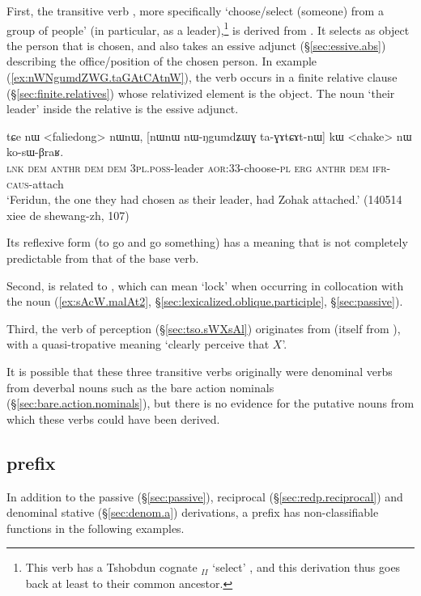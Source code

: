 First, the transitive verb , more specifically `choose/select (someone) from a group of people' (in particular, as a leader),\footnote{This verb has a Tshobdun cognate $_{II}$  `select' \citep[209]{jackson19tshobdun}, and this derivation thus goes back at least to their common ancestor.
} is derived from . It selects as object the person that is chosen, and also takes an essive adjunct  (§\ref{sec:essive.abs}) describing the office/position of the chosen person. In example (\ref{ex:nWNgumdZWG.taGAtCAtnW}), the verb  occurs in a finite relative clause (§\ref{sec:finite.relatives}) whose relativized element is the object. The noun  `their leader' inside the relative is the essive adjunct.

\begin{exe}
\ex \label{ex:nWNgumdZWG.taGAtCAtnW}
\gll tɕe nɯ <faliedong> nɯnɯ, [nɯnɯ nɯ-ŋgumdʑɯɣ ta-ɣɤtɕɤt-nɯ] kɯ <chake> nɯ ko-sɯ-βraʁ. \\
\textsc{lnk} \textsc{dem}  \textsc{anthr} \textsc{dem} \textsc{dem} \textsc{3pl}.\textsc{poss}-leader \textsc{aor}:3\fl{}3-choose-\textsc{pl} \textsc{erg}  \textsc{anthr} \textsc{dem} \textsc{ifr}-\textsc{caus}-attach \\
\glt `Feridun, the one they had chosen as their leader, had Zohak attached.' (140514 xiee de shewang-zh, 107)
\end{exe}

Its reflexive form  (to go and go something) has a meaning that is not completely predictable from that of the base verb.

Second,   is related to , which can mean `lock' when occurring in collocation with the noun  (\ref{ex:sAcW.malAt2}, §\ref{sec:lexicalized.oblique.participle}, §\ref{sec:passive}).

Third,  the verb of perception  (§\ref{sec:tso.sWXsAl}) originates from  (itself from ), with a quasi-tropative meaning  `clearly perceive that $X$'.

It is possible that these three transitive verbs originally were denominal verbs from deverbal nouns such as the bare action nominals (§\ref{sec:bare.action.nominals}), but there is no evidence for the putative nouns from which these verbs could have been derived.

\subsection{ prefix  } \label{sec:a.non.passive.denominal}
In addition to the passive (§\ref{sec:passive}), reciprocal (§\ref{sec:redp.reciprocal}) and denominal stative (§\ref{sec:denom.a}) derivations, a prefix  has non-classifiable functions in the following examples.


